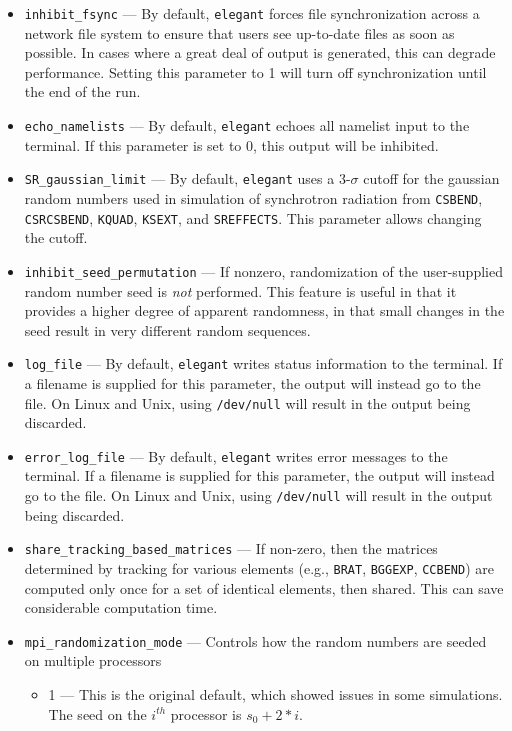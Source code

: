 \documentclass[11pt]{article}
\begin{document}
\begin{itemize}
\item \verb|inhibit_fsync| --- By default, \verb|elegant| forces file synchronization across a network file system
  to ensure that users see up-to-date files as soon as possible.  In cases where a great deal of output is generated,
  this can degrade performance.  Setting this parameter to 1 will turn off synchronization until the end of the run.
\item \verb|echo_namelists| --- By default, \verb|elegant| echoes all namelist input to the terminal.  If this parameter
  is set to 0, this output will be inhibited.
\item \verb|SR_gaussian_limit| --- By default, \verb|elegant| uses a 3-$\sigma$ cutoff for the gaussian random numbers used
  in simulation of synchrotron radiation from \verb|CSBEND|, \verb|CSRCSBEND|, \verb|KQUAD|, \verb|KSEXT|, and \verb|SREFFECTS|.
  This parameter allows changing the cutoff.
\item \verb|inhibit_seed_permutation| --- If nonzero, randomization of the user-supplied random number seed is {\em not} performed.
  This feature is useful in that it provides a higher degree of apparent randomness, in that small changes in the seed result
  in very different random sequences.
\item \verb|log_file| --- By default, \verb|elegant| writes status information to the terminal.  If a filename is supplied
  for this parameter, the output will instead go to the file.  On Linux and Unix, using \verb|/dev/null| will result in 
  the output being discarded.
\item \verb|error_log_file| --- By default, \verb|elegant| writes error messages to the terminal.  If a filename is supplied
  for this parameter, the output will instead go to the file.  On Linux and Unix, using \verb|/dev/null| will result in 
  the output being discarded.
\item \verb|share_tracking_based_matrices| --- If non-zero, then the matrices determined by tracking for various elements
  (e.g., \verb|BRAT|, \verb|BGGEXP|, \verb|CCBEND|) are computed only once for a set of identical elements, then shared.
  This can save considerable computation time.
\item \verb|mpi_randomization_mode| --- Controls how the random numbers are seeded on multiple processors
  \begin{itemize}
    \item 1 --- This is the original default, which showed issues in some simulations. The seed on the $i^{th}$ processor is $s_0+2*i$.

\end{itemize}
\end{itemize}
\end{document}

